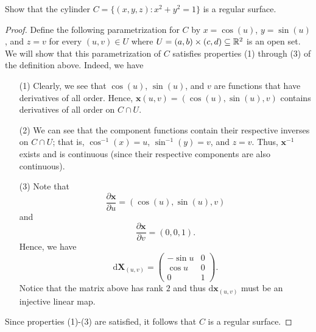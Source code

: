 \documentclass[a4paper]{article}
\begin{document}
\begin{problem}
    Show that the cylinder \( C = \{ (x,y,z) : x^{2} + y^{2} = 1  \}  \) is a regular surface.
\end{problem}
\begin{proof}
Define the following parametrization for \( C  \) by \( x = \cos (u) \), \( y = \sin (u) \), and \( z = v  \) for every \( (u,v) \in U  \) where \( U = (a,b) \times (c,d) \subseteq \mathbb{R}^{2} \) is an open set.
We will show that this parametrization of \( C  \) satisfies properties (1) through (3) of the definition above. 
Indeed, we have 
\begin{enumerate}
    \item[(1)] Clearly, we see that \( \cos(u) \), \( \sin(u) \), and \( v  \) are functions that have derivatives of all order. Hence, \( \textbf{x}(u,v) = (\cos(u), \sin(u), v)  \) contains derivatives of all order on \( C \cap U  \). 
    \item[(2)] We can see that the component functions contain their respective inverses on \( C \cap U  \); that is, \( \cos^{-1}(x) = u  \), \( \sin^{-1}(y) = v   \), and \( z = v  \). Thus, \(  \textbf{x}^{-1} \) exists and is continuous (since their respective components are also continuous).
    \item[(3)] Note that  
        \[  \frac{ \partial \textbf{x} }{ \partial u  }  = (\cos(u), \sin(u), v) \]
        and
            \[  \frac{ \partial \textbf{x} }{ \partial v  }  = (0,0,1). \]
            Hence, we have 
            \[  \text{d} \textbf{X}_{(u,v)} = \begin{pmatrix} - \sin u & 0 \\ \cos u & 0 \\ 0 & 1  \end{pmatrix}. \]
            Notice that the matrix above has rank \( 2  \) and thus \( \text{d} \textbf{x}_{(u,v)} \) must be an injective linear map.
\end{enumerate}
Since properties (1)-(3) are satisfied, it follows that \( C  \) is a regular surface.
\end{proof}
\end{document}
